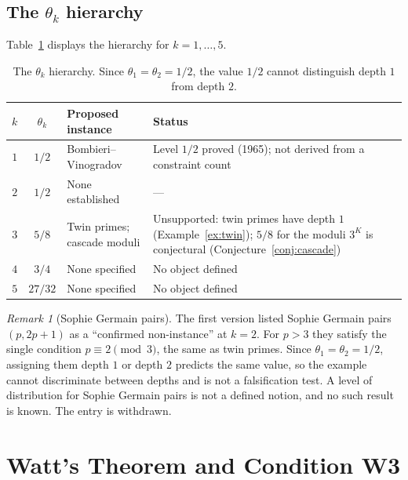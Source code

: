 \documentclass[12pt]{amsart}
\theoremstyle{plain}
\theoremstyle{definition}
\theoremstyle{remark}
\newtheorem{remark}[theorem]{Remark}
\newcommand{\thetak}{\theta_k}
\begin{document}
\subsection{The $\theta_k$ hierarchy}

Table~\ref{tab:hierarchy} displays the hierarchy for $k = 1, \ldots, 5$.

\begin{table}[h]
\centering
\caption{The $\thetak$ hierarchy. Since $\theta_1 = \theta_2 = 1/2$, the value
  $1/2$ cannot distinguish depth $1$ from depth $2$.}
\label{tab:hierarchy}
\begin{tabular}{ccp{4.8cm}p{5.4cm}}
\toprule
$k$ & $\thetak$ & Proposed instance & Status \\
\midrule
$1$ & $1/2$   & Bombieri--Vinogradov & Level $1/2$ proved (1965); not derived
  from a constraint count \\
$2$ & $1/2$   & None established & --- \\
$3$ & $5/8$   & Twin primes; cascade moduli & Unsupported: twin primes have
  depth $1$ (Example~\ref{ex:twin}); $5/8$ for the moduli $3^K$ is conjectural
  (Conjecture~\ref{conj:cascade}) \\
$4$ & $3/4$   & None specified & No object defined \\
$5$ & $27/32$ & None specified & No object defined \\
\bottomrule
\end{tabular}
\end{table}

\begin{remark}[Sophie Germain pairs]
\label{rem:sg}
The first version listed Sophie Germain pairs $(p, 2p+1)$ as a ``confirmed
non-instance'' at $k = 2$. For $p > 3$ they satisfy the single condition
$p \equiv 2 \pmod{3}$, the same as twin primes. Since $\theta_1 = \theta_2 =
1/2$, assigning them depth $1$ or depth $2$ predicts the same value, so the
example cannot discriminate between depths and is not a falsification test. A
level of distribution for Sophie Germain pairs is not a defined notion, and no
such result is known. The entry is withdrawn.
\end{remark}

\appendix
\section{Watt's Theorem and Condition W3}
\label{app:watt}
\end{document}

